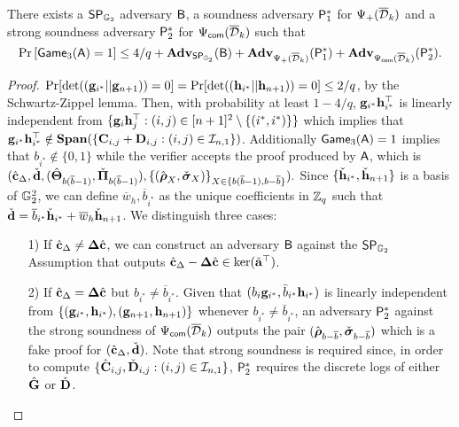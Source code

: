\begin{lemma} There exists a $\mathsf{SP}_{\mathbb{G}_2}$ adversary $\mathcal{\mathsf{B}}$, a soundness adversary $\mathsf{P}^*_1$  for ${\Psi_{+}(\overline{\mathcal{D}}_k)}$ and 
a strong soundness adversary $\mathsf{P}^*_2$ for ${{\Psi_{\mathsf{com}}(\overline{\mathcal{D}}_k)}}$  such that
$$\Pr\left[\mathsf{Game}_3(\mathsf{A})=1\right] \leq 4/q + \mathbf{Adv}_{\mathsf{SP}_{\mathbb{G}_2}}(\mathsf{B}) +
\mathbf{Adv}_{\Psi_{+}(\overline{\mathcal{D}}_k)}(\mathsf{P}^*_1)+\mathbf{Adv}_{{\Psi_{\mathsf{com}}(\overline{\mathcal{D}}_k)}}(\mathsf{P}^*_2).$$  
\label{lemma:G3}
\end{lemma}
\begin{proof}
$\Pr[\det((\mathbf{g}_{i^*}||\mathbf{g}_{n+1}))=0]=\Pr[\det((\mathbf{h}_{i^*}||\mathbf{h}_{n+1}))=0]\leq2/q$, by the Schwartz-Zippel lemma. Then, with probability at least $1-4/q$, $\mathbf{g}_{i^*}\mathbf{h}_{i^*}^\top$ is linearly independent from
$\{\mathbf{g}_{i}\mathbf{h}_j^\top:(i,j)\in[n+1]^2\setminus\{(i^*, i^*)\}\}$ which implies that $\mathbf{g}_{i^*}\mathbf{h}_{i^*}^\top\notin\mathbf{Span}(\{\mathbf{{C}}_{i,j}+\mathbf{{D}}_{i,j}:(i,j)\in\mathcal{I}_{n,1}\})$. 
Additionally  $\mathsf{Game}_3(\mathsf{A})=1$ implies that $b_{i^*} \notin \{0,1\}$
while the verifier accepts the proof  produced by $\mathsf{A}$, which is
$ (
        {\hat{\mathbf{c}}}_{\Delta}, \check{\mathbf{d}},
        ({\hat{\mathbf{{\Theta}}}}_{b(\overline{b}-1)}, \check{\mathbf{{\Pi}}}_{b(\overline{b}-1)}), 
        \{(\hat{\boldsymbol \rho}_{X}, \check{\boldsymbol \sigma}_{X})\}_{X \in \{b(\overline{b}-1), b-\overline{b}\}} ).$ Since $\{\check{\mathbf{h}}_{i^*},\check{\mathbf{h}}_{n+1}\}$ is a basis of $\mathbb{G}_2^2$,
we can define $\overline{w}_h,\overline{b}_{i^*}$ as the unique coefficients in $\mathbb{Z}_q$ such that $\check{\mathbf{d}}= \overline{b}_{i^*} \check{\mathbf{h}}_{i^*} + \overline{w}_h \check{\mathbf{h}}_{n+1}$.
We distinguish three cases:
\begin{itemize}
\item[1)] If $\hat{\mathbf{c}}_{\Delta} \neq \mathbf{{\Delta}} \hat{\mathbf{c}}$, we can construct an adversary 
$\mathsf{B}$ against the $\mathsf{SP}_{\mathbb{G}_2}$ Assumption that outputs 
$\hat{\mathbf{c}}_{\Delta}-\mathbf{{\Delta}} \hat{\mathbf{c}}\in\ker(\check{\mathbf{{a}}}^\top)$.
\item[2)] If $\hat{\mathbf{c}}_{\Delta} = \mathbf{{\Delta}} \hat{\mathbf{c}}$ but $b_{i^*} \neq \overline{b}_{i^*}$. Given that $(b_{i}\mathbf{g}_{i^*},\bar{b}_{i^*}\mathbf{h}_{i^*})$ is linearly independent from $\{(\mathbf{g}_{i^*},\mathbf{h}_{i^*}),(\mathbf{g}_{n+1},\mathbf{h}_{n+1})\}$
whenever $b_{i^*}\neq\bar{b}_{i^*}$, an adversary
$\mathsf{P}^*_2$ against the strong soundness of ${{\Psi_{\mathsf{com}}(\overline{\mathcal{D}}_k)}}$
outputs the pair $(\hat{{\boldsymbol \rho}}_{b-\overline{b}},
\check{{\boldsymbol \sigma}}_{b-\overline{b}})
$ which is a fake proof for 
$({\hat{\mathbf{c}}}_\Delta,\check{\mathbf{d}})$. Note that strong soundness is required since, in order to compute $\{{\hat{\mathbf{{C}}}}_{i,j},\check{\mathbf{{D}}}_{i,j}:(i,j)\in\mathcal{I}_{n,1}\}$, $\mathsf{P}^*_2$ requires the discrete logs of either ${\hat{\mathbf{{G}}}}$ or $\check{\mathbf{{D}}}$.

\end{itemize}
\end{proof}
